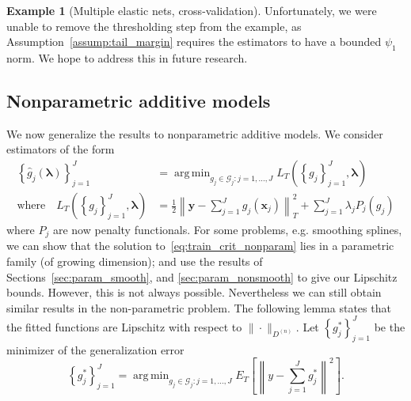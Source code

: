 \documentclass[12pt]{article} %
\theoremstyle{definition}
\newtheorem{example}{Example}
\DeclareMathOperator*{\argmin}{arg\,min}
\begin{document}
\begin{example}[Multiple elastic nets, cross-validation]
	Unfortunately, we were unable to remove the thresholding step from the example, as Assumption~\ref{assump:tail_margin} requires the estimators to have a bounded $\psi_1$ norm. We hope to address this in future research.
\end{example}

\subsection{Nonparametric additive models}
\label{sec:nonparam_smooth}

We now generalize the results to nonparametric additive models. We consider estimators of the form
\begin{align}
\label{eq:train_crit_nonparam}
\left\{ \hat{g}_j( \boldsymbol \lambda) \right \}_{j=1}^J &= 
\argmin_{g_j\in \mathcal{G}_j: j=1,...,J}  L_T\left (\left \{ g_j \right \}_{j=1}^J, \boldsymbol{\lambda} \right ) \\
\text{where} \quad L_T \left (\left \{ g_j \right \}_{j=1}^J, \boldsymbol{\lambda} \right ) &=
\frac{1}{2} \left \| \boldsymbol y -  \sum_{j=1}^J g_j(\boldsymbol x_j) \right \|^2_T 
+ \sum_{j=1}^J \lambda_j P_j(g_j)
\end{align}
where $P_j$ are now penalty functionals. For some problems, e.g. smoothing splines, we can show that the solution to~\eqref{eq:train_crit_nonparam} lies in a parametric family (of growing dimension); and use the results of Sections~\ref{sec:param_smooth}, and \ref{sec:param_nonsmooth} to give our Lipschitz bounds. However, this is not always possible. Nevertheless we can still obtain similar results in the non-parametric problem. The following lemma states that the fitted functions are Lipschitz with respect to $\| \cdot \|_{D^{(n)}}$. Let $\left\{ g_j^* \right \}_{j=1}^J$ be the minimizer of the generalization error
\begin{equation}
\left\{ g_j^* \right \}_{j=1}^J = \argmin_{g_j \in \mathcal{G}_j: j=1,...,J} E_T\left[ \left \| y - \sum_{j=1}^J g_j^* \right \|^2 \right].
\end{equation}
\end{document}
